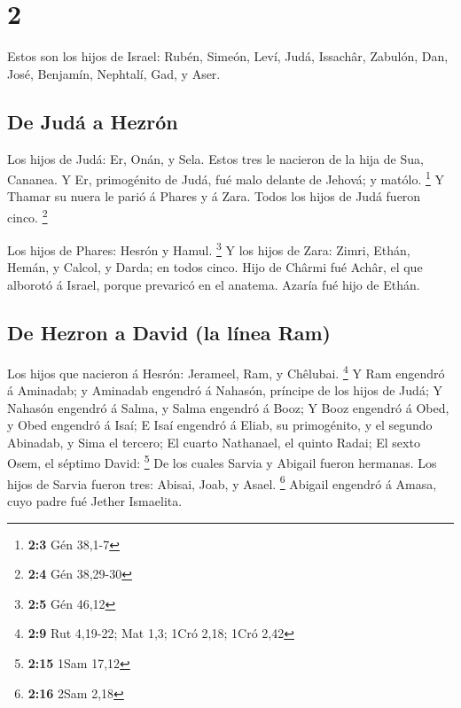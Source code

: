 \hypertarget{section-1}{%
\section{2}\label{section-1}}

 Estos son los hijos de Israel: Rubén, Simeón, Leví, Judá,
Issachâr, Zabulón,  Dan, José, Benjamín, Nephtalí, Gad, y
Aser.

\hypertarget{de-juduxe1-a-hezruxf3n}{%
\subsection{De Judá a Hezrón}\label{de-juduxe1-a-hezruxf3n}}

 Los hijos de Judá: Er, Onán, y Sela. Estos tres le
nacieron de la hija de Sua, Cananea. Y Er, primogénito de Judá, fué malo
delante de Jehová; y matólo. \footnote{\textbf{2:3} Gén 38,1-7}
 Y Thamar su nuera le parió á Phares y á Zara. Todos los
hijos de Judá fueron cinco. \footnote{\textbf{2:4} Gén 38,29-30}

 Los hijos de Phares: Hesrón y Hamul. \footnote{\textbf{2:5}
  Gén 46,12}  Y los hijos de Zara: Zimri, Ethán, Hemán, y
Calcol, y Darda; en todos cinco.  Hijo de Chârmi fué
Achâr, el que alborotó á Israel, porque prevaricó en el anatema.
 Azaría fué hijo de Ethán.

\hypertarget{de-hezron-a-david-la-luxednea-ram}{%
\subsection{De Hezron a David (la línea
Ram)}\label{de-hezron-a-david-la-luxednea-ram}}

 Los hijos que nacieron á Hesrón: Jerameel, Ram, y
Chêlubai. \footnote{\textbf{2:9} Rut 4,19-22; Mat 1,3; 1Cró 2,18; 1Cró
  2,42}  Y Ram engendró á Aminadab; y Aminadab engendró á
Nahasón, príncipe de los hijos de Judá;  Y Nahasón
engendró á Salma, y Salma engendró á Booz;  Y Booz
engendró á Obed, y Obed engendró á Isaí;  E Isaí engendró
á Eliab, su primogénito, y el segundo Abinadab, y Sima el tercero;
 El cuarto Nathanael, el quinto Radai;  El
sexto Osem, el séptimo David: \footnote{\textbf{2:15} 1Sam 17,12}
 De los cuales Sarvia y Abigail fueron hermanas. Los
hijos de Sarvia fueron tres: Abisai, Joab, y Asael. \footnote{\textbf{2:16}
  2Sam 2,18}  Abigail engendró á Amasa, cuyo padre fué
Jether Ismaelita.

